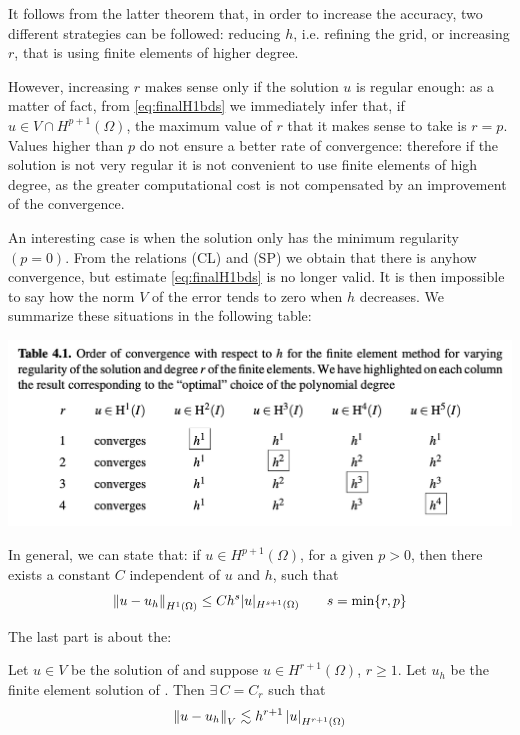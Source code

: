 It follows from the latter theorem that, in order to increase the accuracy, two different strategies can be followed: reducing $h$, i.e. refining the grid, or increasing $r$, that is using finite elements of higher degree. 

\smallskip

However, increasing $r$ makes sense only if the solution $u$ is regular enough: as a matter of fact, from \eqref{eq:finalH1bds} we immediately infer that, if $u \in V \cap H^{p+1}(\Omega)$, the maximum value of $r$ that it makes sense to take is $r = p$. Values higher than $p$ do not ensure a better rate of convergence: therefore if the solution is not very regular it is not convenient to use finite elements of high degree, as the greater computational cost is not compensated by an improvement of the convergence. 

\smallskip

An interesting case is when the solution only has the minimum regularity $(p = 0)$. From the relations (CL) and (SP) we obtain that there is anyhow convergence, but estimate \eqref{eq:finalH1bds} is no longer valid. It is then impossible to say how the norm $V$ of the error tends to zero when $h$ decreases. We summarize these situations in the following table:

\begin{Figure}
    \centering
    \includegraphics[width=\linewidth]{images/Q1}
\end{Figure}

In general, we can state that: if $u \in H^{p+1}(\Omega)$, for a given $p > 0$, then there exists a constant $C$ independent of $u$ and $h$, such that
\begin{equation*}
\left\lVert u-u_h \right\rVert_{H^1(\Omega)} \leq C h^s |u|_{H^{s+1}(\Omega)} \qquad s = \min\{r,p\}
\end{equation*}

The last part is about the:
\begin{theorem}
Let $u\in V$ be the solution of {} and suppose $u\in H^{r+1}(\Omega)$, $r\geq 1$. Let $u_h$ be the finite element solution of {}. Then $\exists\,C=C_r$ such that
\begin{equation}
\label{eq:finalL2bds}
\left\lVert u-u_h \right\rVert_V\lesssim h^{r+1}\left\lvert u \right\rvert_{H^{r+1}(\Omega)}
\end{equation}
\end{theorem}\vspace{-0.2cm}


